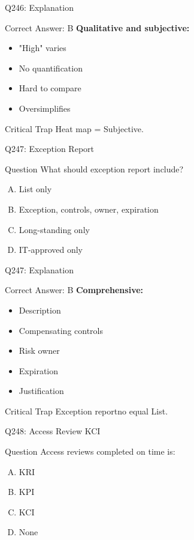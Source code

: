 \documentclass{beamer}
\begin{document}
	\begin{frame}{Q246: Explanation}
		\begin{block}{Correct Answer: B}
			\textbf{Qualitative and subjective:}
			\begin{itemize}
				\item "High" varies
				\item No quantification
				\item Hard to compare
				\item Oversimplifies
			\end{itemize}
		\end{block}
		\begin{alertblock}{Critical Trap}
			Heat map = Subjective.
		\end{alertblock}
	\end{frame}
	
	\begin{frame}{Q247: Exception Report}
		\begin{block}{Question}
			What should exception report include?
		\end{block}
		\begin{enumerate}[(A)]
			\item List only
			\item Exception, controls, owner, expiration
			\item Long-standing only
			\item IT-approved only
		\end{enumerate}
	\end{frame}
	
	\begin{frame}{Q247: Explanation}
		\begin{block}{Correct Answer: B}
			\textbf{Comprehensive:}
			\begin{itemize}
				\item Description
				\item Compensating controls
				\item Risk owner
				\item Expiration
				\item Justification
			\end{itemize}
		\end{block}
		\begin{alertblock}{Critical Trap}
			Exception reportno equal List.
		\end{alertblock}
	\end{frame}
	
	\begin{frame}{Q248: Access Review KCI}
		\begin{block}{Question}
			Access reviews completed on time is:
		\end{block}
		\begin{enumerate}[(A)]
			\item KRI
			\item KPI
			\item KCI
			\item None
		\end{enumerate}
	\end{frame}
	
\end{document}
